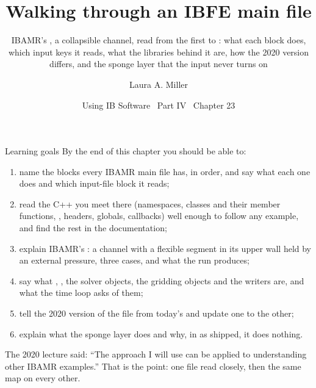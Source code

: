 \documentclass[aspectratio=169,11pt]{beamer}
\title[Walking through a main file]{Walking through an IBFE main file}
\subtitle{IBAMR's \code{IBFE/explicit/ex7}, a collapsible channel, read from the first \code{\#include} to \code{output\_data}: what each block does, which input keys it reads, what the libraries behind it are, how the 2020 version differs, and the sponge layer that the input never turns on}
\author[Miller]{Laura A. Miller}
\institute[UArizona]{Department of Mathematics, University of Arizona}
\date{Using IB Software \textbullet\ Part IV \textbullet\ Chapter 23}
\begin{document}
\begin{frame}[plain]
\end{frame}

\begin{frame}{Learning goals}
\label{fr:goals}
\footnotesize By the end of this chapter you should be able to:
\begin{enumerate}
  \item name the blocks every IBAMR main file has, in order, and say what each one does and which input-file block it reads;
  \item read the C++ you meet there (namespaces, classes and their member functions, , headers,  globals, callbacks) well enough to follow any example, and find the rest in the documentation;
  \item explain IBAMR's : a channel with a flexible segment in its upper wall held by an external pressure, three cases, and what the run produces;
  \item say what , , the solver objects, the gridding objects and the writers are, and what the time loop asks of them;
  \item tell the 2020 version of the file from today's and update one to the other;
  \item explain what the sponge layer does and why, in  as shipped, it does nothing.
\end{enumerate}
\begin{punchbox}
\footnotesize The 2020 lecture said: ``The approach I will use can be applied to understanding other IBAMR examples.'' That is the point: one file read closely, then the same map on every other.
\end{punchbox}
\end{frame}
\end{document}
